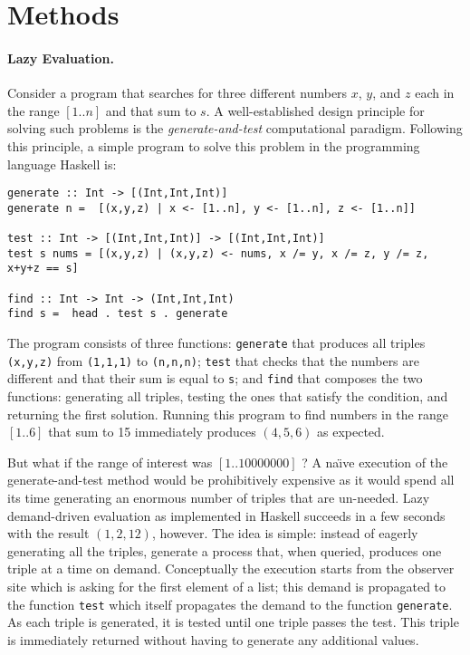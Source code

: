 \documentclass{article}
\begin{document}



\section{Methods}

\paragraph*{Lazy Evaluation.}
Consider a program that searches for three different numbers $x$, $y$,
and $z$ each in the range $[1..n]$ and that sum to $s$. A
well-established design principle for solving such problems is the
\emph{generate-and-test} computational paradigm. Following this
principle, a simple program to solve this problem in the programming
language Haskell is:

\begin{verbatim}
generate :: Int -> [(Int,Int,Int)]
generate n =  [(x,y,z) | x <- [1..n], y <- [1..n], z <- [1..n]]

test :: Int -> [(Int,Int,Int)] -> [(Int,Int,Int)]
test s nums = [(x,y,z) | (x,y,z) <- nums, x /= y, x /= z, y /= z, x+y+z == s]

find :: Int -> Int -> (Int,Int,Int)
find s =  head . test s . generate
\end{verbatim}

The program consists of three functions: \verb|generate| that produces
all triples \verb|(x,y,z)| from \verb|(1,1,1)| to \verb|(n,n,n)|;
\verb|test| that checks that the numbers are different and that their
sum is equal to \verb|s|; and \verb|find| that composes the two
functions: generating all triples, testing the ones that satisfy the
condition, and returning the first solution. Running this program to
find numbers in the range $[1..6]$ that sum to 15 immediately produces
$(4,5,6)$ as expected.

But what if the range of interest was $[1..10000000]$ ? A na\"\i ve
execution of the generate-and-test method would be prohibitively
expensive as it would spend all its time generating an enormous number
of triples that are un-needed. Lazy demand-driven evaluation as
implemented in Haskell succeeds in a few seconds with the result
$(1,2,12)$, however. The idea is simple: instead of eagerly generating
all the triples, generate a process that, when queried, produces one
triple at a time on demand. Conceptually the execution starts from the
observer site which is asking for the first element of a list; this
demand is propagated to the function \verb|test| which itself
propagates the demand to the function \verb|generate|. As each triple
is generated, it is tested until one triple passes the test. This
triple is immediately returned without having to generate any
additional values.
\end{document}
